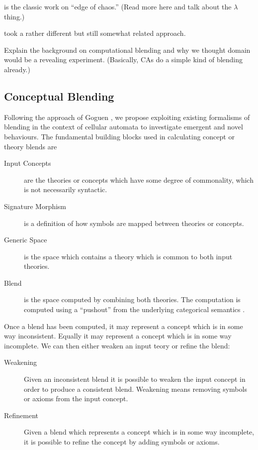 \documentclass{AISB2008}
\begin{document}
\cite{mitchell1993revisiting} is the classic work on ``edge of
chaos.'' (Read more here and talk about the $\lambda$ thing.)

\cite{hofstadter1995prolegomena,marshall1999metacat} took a rather
different but still somewhat related approach.


Explain the background on computational blending and why we thought
domain would be a revealing experiment.  (Basically, CAs do a simple
kind of blending already.)

\subsection{Conceptual Blending}

Following the approach of Goguen \cite{}, we propose exploiting
existing formalisms of blending in the context of cellular automata to
investigate emergent and novel behaviours. The fundamental building blocks used in calculating concept or theory blends are
\begin{description}
\item[Input Concepts] are the theories or concepts which have some degree of commonality, which is not necessarily syntactic. 
\item[Signature Morphism] is a definition of how symbols are mapped between theories or concepts. 
\item[Generic Space] is the space which contains a theory which is common to both input theories.
\item[Blend] is the space computed by combining both theories. The computation is computed using a ``pushout'' from the underlying categorical semantics \cite{}. 
\end{description}

Once a blend has been computed, it may represent a concept which is in some way inconsistent. Equally it may represent a concept which is in some way incomplete. We can then either weaken an input teory or refine the blend:
\begin{description}
\item[Weakening] Given an inconsistent blend it is possible to weaken the input concept in order to produce a consistent blend. Weakening means removing symbols or axioms from the input concept.
\item[Refinement] Given a blend which represents a concept which is in some way incomplete, it is possible to refine the concept by adding symbols or axioms.
\end{description}
\end{document}
